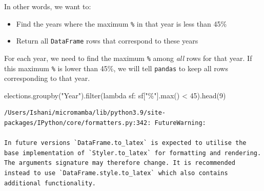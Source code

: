 \documentclass[
  letterpaper,
  DIV=11,
  numbers=noendperiod]{scrreprt}
\newenvironment{Shaded}{\begin{snugshade}}{\end{snugshade}}
\newcommand{\BuiltInTok}[1]{\textcolor[rgb]{0.00,0.23,0.31}{#1}}
\newcommand{\DecValTok}[1]{\textcolor[rgb]{0.68,0.00,0.00}{#1}}
\newcommand{\KeywordTok}[1]{\textcolor[rgb]{0.00,0.23,0.31}{#1}}
\newcommand{\NormalTok}[1]{\textcolor[rgb]{0.00,0.23,0.31}{#1}}
\newcommand{\OperatorTok}[1]{\textcolor[rgb]{0.37,0.37,0.37}{#1}}
\newcommand{\StringTok}[1]{\textcolor[rgb]{0.13,0.47,0.30}{#1}}
\providecommand{\tightlist}{%
  \setlength{\itemsep}{0pt}\setlength{\parskip}{0pt}}\usepackage{longtable,booktabs,array}
\begin{document}
In other words, we want to:

\begin{itemize}
\tightlist
\item
  Find the years where the maximum \texttt{\%} in that year is less than
  45\%
\item
  Return all \texttt{DataFrame} rows that correspond to these years
\end{itemize}

For each year, we need to find the maximum \texttt{\%} among \emph{all}
rows for that year. If this maximum \texttt{\%} is lower than 45\%, we
will tell \texttt{pandas} to keep all rows corresponding to that year.

\begin{Shaded}
\begin{Highlighting}[]
\NormalTok{elections.groupby(}\StringTok{"Year"}\NormalTok{).}\BuiltInTok{filter}\NormalTok{(}\KeywordTok{lambda}\NormalTok{ sf: sf[}\StringTok{"\%"}\NormalTok{].}\BuiltInTok{max}\NormalTok{() }\OperatorTok{\textless{}} \DecValTok{45}\NormalTok{).head(}\DecValTok{9}\NormalTok{)}
\end{Highlighting}
\end{Shaded}

\begin{verbatim}
/Users/Ishani/micromamba/lib/python3.9/site-packages/IPython/core/formatters.py:342: FutureWarning:

In future versions `DataFrame.to_latex` is expected to utilise the base implementation of `Styler.to_latex` for formatting and rendering. The arguments signature may therefore change. It is recommended instead to use `DataFrame.style.to_latex` which also contains additional functionality.
\end{verbatim}
\end{document}
